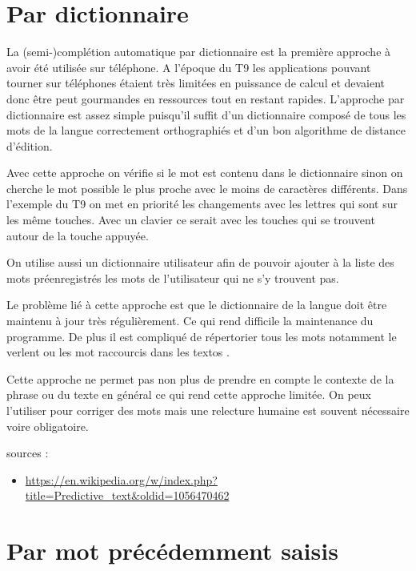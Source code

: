 \documentclass[final, 10pt]{report}
\begin{document}
\section{Par dictionnaire}

    La (semi-)complétion automatique par dictionnaire est la première approche à avoir été utilisée sur téléphone.
    A l'époque du \og T9\fg{} les applications pouvant tourner sur téléphones étaient très limitées en puissance de calcul et devaient donc être peut gourmandes en ressources tout en restant rapides. 
    L'approche par dictionnaire est assez simple puisqu'il suffit d'un dictionnaire composé de tous les mots de la langue correctement orthographiés et d'un bon algorithme de distance d'édition.
    
    
    Avec cette approche on vérifie si le mot est contenu dans le dictionnaire sinon on cherche le mot possible le plus proche avec le moins de caractères différents. 
    Dans l'exemple du T9 on met en priorité les changements avec les lettres qui sont sur les même touches. 
    Avec un clavier ce serait avec les touches qui se trouvent autour de la touche appuyée.
    
    
    On utilise aussi un dictionnaire utilisateur afin de pouvoir ajouter à la liste des mots préenregistrés les mots de l'utilisateur qui ne s'y trouvent pas.
    
    Le problème lié à cette approche est que le dictionnaire de la langue doit être maintenu à jour très régulièrement. Ce qui rend difficile la maintenance du programme. De plus il est compliqué de répertorier tous les mots notamment le \og verlent \fg{} ou les mot raccourcis dans les \og textos \fg{}.
    
    Cette approche ne permet pas non plus de prendre en compte le contexte de la phrase ou du texte en général ce qui rend cette approche limitée. On peux l'utiliser pour corriger des mots mais une relecture humaine est souvent nécessaire voire obligatoire.

    sources : 
    \begin{itemize}
        \item \url{https://en.wikipedia.org/w/index.php?title=Predictive_text&oldid=1056470462}
    \end{itemize}

\section{Par mot précédemment saisis}
\end{document}
